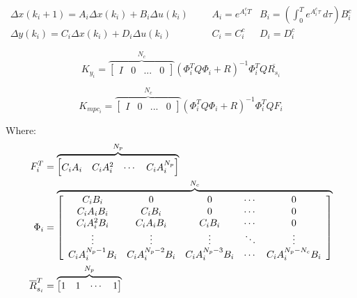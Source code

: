         
        $$\begin{matrix}
            \Delta x(k_i+1) = A_i \Delta  x(k_i) + B_i \Delta  u(k_i) & & & A_i = e^{A_i^c T} & B_i = \left (  \int_{0}^{T} e^{A_i^c \tau}\, d\tau \right ) B_i^c \\
            \Delta y(k_i)   = C_i \Delta x(k_i) + D_i \Delta u(k_i)   & & & C_i = C_i^c       & D_i = D_i^c
        \end{matrix}$$

        $$K_{y_i} = \overset{N_c}{\overbrace{\begin{bmatrix} I& 0 & ... & 0 \end{bmatrix}}} (\Phi_i^{T}Q\Phi_i + R)^{-1}\Phi^{T}_i Q\overline{R_{s_i}}$$
        
        $$K_{mpc_i} = \overset{N_c}{\overbrace{\begin{bmatrix} I& 0 & ... & 0 \end{bmatrix}}} (\Phi_i^{T}Q\Phi_i + R)^{-1}\Phi^{T}_i Q F_i$$

        Where: 
        \begin{equation*}
           \aligned
                F_{i}^T &= \overset{N_p}{\overbrace{\begin{bmatrix} C_i A_i & C_i A^{2}_i & \cdots & C_i A^{N_{p}}_i \end{bmatrix}}} \\
                \Phi_i &=  \overset{N_c}{\overbrace{\left [ \begin{array}{ccccc}
                         C_i B_i & 0 & 0 & \cdots & 0 \\
                         C_i A_i B_i & C_i B_i & 0 & \cdots & 0 \\
                         C_i A^{2}_i B_i & C_i A_i B_i & C_i B_i & \cdots & 0 \\
                         \vdots & \vdots & \vdots & \ddots & \vdots \\
                         C_i A^{N_{p}-1}_i B_i & C_i A^{N_{p}-2}_i B_i & C_i A^{N_{p}-3}_i B_i & \cdots &  C_i A_{i}^{N_{p}-N_{c}} B_i \end{array}  \right ]}} \\
                \overline R_{s_i}^T &= \overset{N_p}{\overbrace{\begin{bmatrix} 1& 1 & \cdots & 1 \end{bmatrix}}}
            \endaligned
        \end{equation*}
            
            





